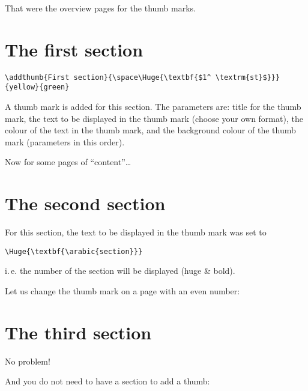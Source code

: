 \documentclass[twoside,british]{article}[2007/10/19]%
\begin{document}
%

That were the overview pages for the thumb marks.

\newpage

\section{The first section}

\begin{verbatim}
\addthumb{First section}{\space\Huge{\textbf{$1^ \textrm{st}$}}}{yellow}{green}
\end{verbatim}

A thumb mark is added for this section. The parameters are: title for the thumb mark,
the text to be displayed in the thumb mark (choose your own format),
the colour of the text in the thumb mark,
and the background colour of the thumb mark (parameters in this order).\newline

Now for some pages of \textquotedblleft content\textquotedblright\ldots

\newpage
\lipsum[1]
\newpage
\lipsum[1]
\newpage
\lipsum[1]
\newpage

\section{The second section}

For this section, the text to be displayed in the thumb mark was set to
\begin{verbatim}
\Huge{\textbf{\arabic{section}}}
\end{verbatim}
i.\,e. the number of the section will be displayed (huge \& bold).\newline

Let us change the thumb mark on a page with an even number:

\newpage

\section{The third section}

No problem!

And you do not need to have a section to add a thumb:
\end{document}
